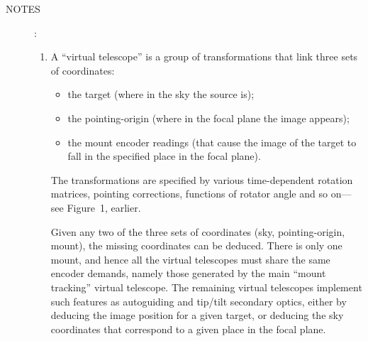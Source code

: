 \documentclass[12pt,fleqn,twoside]{article}
\renewcommand{\_}{{\tt\char'137}}     %
\newcommand{\notes}[1]
{
  \goodbreak
  \begin{description}
    \item[NOTES]: \nopagebreak
        #1
  \end{description}
  \vspace{-3ex}
}
\begin{document}
\notes{
\begin{enumerate}
\setlength{\parskip}{\medskipamount}
\item A ``virtual telescope'' is a group of transformations that link
      three sets of coordinates:
      \begin{itemize}
      \item the target (where in the sky the source is);
      \item the pointing-origin (where in the focal plane the image
            appears);
      \item the mount encoder readings (that cause the image of the
            target to fall in the specified place in the focal plane).
      \end{itemize}
      The transformations are specified by various time-dependent
      rotation matrices, pointing corrections, functions of rotator
      angle and so on---see Figure~1, earlier.

      Given any two of the three sets of coordinates
      (sky, pointing-origin, mount), the missing coordinates
      can be deduced.  There is
      only one mount, and hence all the virtual telescopes must share
      the same encoder demands, namely those generated by the main
      ``mount tracking'' virtual telescope.  The remaining virtual
      telescopes implement such features as autoguiding and tip/tilt
      secondary optics, either by deducing the image position for a
      given target, or deducing the sky coordinates that correspond to
      a given place in the focal plane.


\end{enumerate}}
\end{document}
